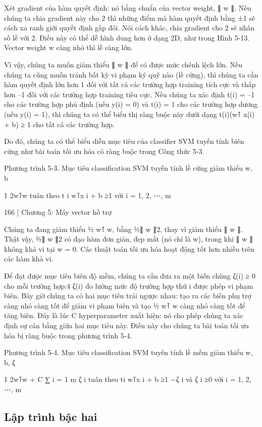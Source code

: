 Xét gradient của hàm quyết định: nó bằng chuẩn của vector weight, ∥ w ∥. Nếu chúng ta chia gradient này cho 2 thì những điểm mà hàm quyết định bằng ±1 sẽ cách xa ranh giới quyết định gấp đôi. Nói cách khác, chia gradient cho 2 sẽ nhân số lề với 2. Điều này có thể dễ hình dung hơn ở dạng 2D, như trong Hình 5-13. Vector weight w càng nhỏ thì lề càng lớn.

Vì vậy, chúng ta muốn giảm thiểu ∥ w ∥ để có được mức chênh lệch lớn. Nếu chúng ta cũng muốn tránh bất kỳ vi phạm ký quỹ nào (lề cứng), thì chúng ta cần hàm quyết định lớn hơn 1 đối với tất cả các trường hợp training tích cực và thấp hơn –1 đối với các trường hợp training tiêu cực. Nếu chúng ta xác định t(i) = –1 cho các trường hợp phủ định (nếu y(i) = 0) và t(i) = 1 cho các trường hợp dương (nếu y(i) = 1), thì chúng ta có thể biểu thị ràng buộc này dưới dạng t(i)(w⊺ x(i) + b) ≥ 1 cho tất cả các trường hợp.

Do đó, chúng ta có thể biểu diễn mục tiêu của classifier SVM tuyến tính biên cứng như bài toán tối ưu hóa có ràng buộc trong Công thức 5-3.

Phương trình 5-3. Mục tiêu classification SVM tuyến tính lề cứng giảm thiểu w, b

1 2w⊺w tuân theo t i w⊺x i + b ≥1 với i = 1, 2, ⋯, m

166 | Chương 5: Máy vector hỗ trợ

Chúng ta đang giảm thiểu ½ w⊺ w, bằng ½∥ w ∥2, thay vì giảm thiểu ∥ w ∥. Thật vậy, ½∥ w ∥2 có đạo hàm đơn giản, đẹp mắt (nó chỉ là w), trong khi ∥ w ∥ không khả vi tại w = 0. Các thuật toán tối ưu hóa hoạt động tốt hơn nhiều trên các hàm khả vi.

Để đạt được mục tiêu biên độ mềm, chúng ta cần đưa ra một biến chùng ζ(i) ≥ 0 cho mỗi trường hợp:4 ζ(i) đo lường mức độ trường hợp thứ i được phép vi phạm biên. Bây giờ chúng ta có hai mục tiêu trái ngược nhau: tạo ra các biến phụ trợ càng nhỏ càng tốt để giảm vi phạm biên và tạo ½ w⊺ w càng nhỏ càng tốt để tăng biên. Đây là lúc C hyperparameter xuất hiện: nó cho phép chúng ta xác định sự cân bằng giữa hai mục tiêu này. Điều này cho chúng ta bài toán tối ưu hóa bị ràng buộc trong phương trình 5-4.

Phương trình 5-4. Mục tiêu classification SVM tuyến tính lề mềm giảm thiểu w, b, ζ

1 2w⊺w + C ∑ i = 1 m ζ i tuân theo ti w⊺x i + b ≥1 −ζ i và ζ i ≥0 với i = 1, 2, ⋯, m

\subsection{Lập trình bậc hai}

